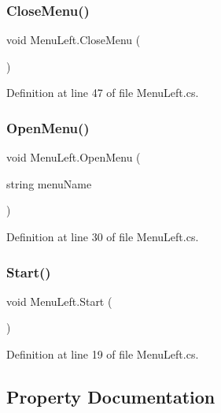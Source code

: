 \subsubsection{\texorpdfstring{Close\+Menu()}{CloseMenu()}}
{\footnotesize\ttfamily void Menu\+Left.\+Close\+Menu (\begin{DoxyParamCaption}{ }\end{DoxyParamCaption})}



Definition at line 47 of file Menu\+Left.\+cs.

\mbox{\label{class_menu_left_af496f320115faf9206952beceae0028c}} 
\subsubsection{\texorpdfstring{Open\+Menu()}{OpenMenu()}}
{\footnotesize\ttfamily void Menu\+Left.\+Open\+Menu (\begin{DoxyParamCaption}\item[{string}]{menu\+Name }\end{DoxyParamCaption})}



Definition at line 30 of file Menu\+Left.\+cs.

\mbox{\label{class_menu_left_af0a3f04327b3d529fa3609ffe2087906}} 
\subsubsection{\texorpdfstring{Start()}{Start()}}
{\footnotesize\ttfamily void Menu\+Left.\+Start (\begin{DoxyParamCaption}{ }\end{DoxyParamCaption})}



Definition at line 19 of file Menu\+Left.\+cs.



\subsection{Property Documentation}
\mbox{\label{class_menu_left_a233fd4ceb820f73d304cc11afe6035f4}} 
